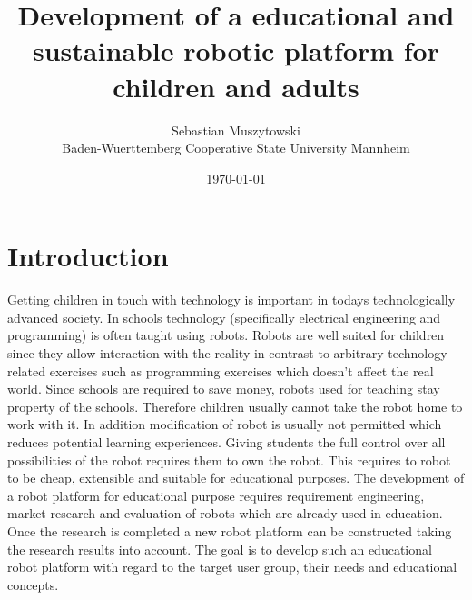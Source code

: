 \documentclass[11pt,a4paper]{article}
\title{Development of a educational and sustainable robotic platform for children and adults}
\date{\today}
\author{Sebastian Muszytowski \\Baden-Wuerttemberg Cooperative State University Mannheim }
\begin{document}
\maketitle


\section{Introduction}
Getting children in touch with technology is important in todays technologically advanced society. In schools technology (specifically electrical engineering and programming) is often taught using robots. Robots are well suited for children since they allow interaction with the reality in contrast to arbitrary technology related exercises such as programming exercises which doesn't affect the real world.\newline 
Since schools are required to save money, robots used for teaching stay property of the schools. Therefore children usually cannot take the robot home to work with it. In addition modification of robot is usually not permitted which reduces potential learning experiences. Giving students the full control over all possibilities of the robot requires them to own the robot. This requires to robot to be cheap, extensible and suitable for educational purposes.\newline
The development of a robot platform for educational purpose requires requirement engineering, market research and evaluation of robots which are already used in education. Once the research is completed a new robot platform can be constructed taking the research results into account. The goal is to develop such an educational robot platform with regard to the target user group, their needs and educational concepts.
\end{document}
